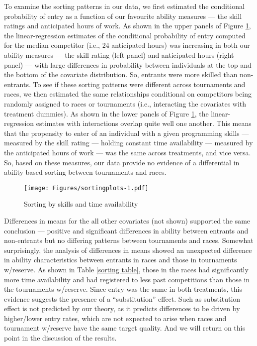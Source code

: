 \documentclass[11pt, titlepage]{article}
\begin{document}
To examine the sorting patterns in our data, we first estimated the
conditional probability of entry as a function of our favourite ability
measures --- the skill ratings and anticipated hours of work. As shown
in the upper panels of Figure \ref{sorting plot}, the linear-regression
estimates of the conditional probability of entry computed for the
median competitor (i.e., 24 anticipated hours) was increasing in both
our ability measures --- the skill rating (left panel) and anticipated
hours (right panel) --- with large differences in probability between
individuals at the top and the bottom of the covariate distribution. So,
entrants were more skilled than non-entrants. To see if these sorting
patterns were different across tournaments and races, we then estimated
the same relationships conditional on competitors being randomly
assigned to races or tournaments (i.e., interacting the covariates with
treatment dummies). As shown in the lower panels of Figure
\ref{sorting plot}, the linear-regression estimates with interactions
overlap quite well one another. This means that the propensity to enter
of an individual with a given programming skills --- measured by the
skill rating --- holding constant time availability --- measured by the
anticipated hours of work --- was the same across treatments, and vice
versa. So, based on these measures, our data provide no evidence of a
differential in ability-based sorting between tournaments and races.

\begin{figure}
\caption{Sorting by skills and time availability}
\label{sorting plot}
\texttt{[image: Figures/sortingplots-1.pdf]}
\end{figure}

Differences in means for the all other covariates (not shown) supported
the same conclusion --- positive and significant differences in ability
between entrants and non-entrants but no differing patterns between
tournaments and races. Somewhat surprisingly, the analysis of
differences in means showed an unexpected difference in ability
characteristics between entrants in races and those in tournaments
w/reserve. As shown in Table \ref{sorting table}, those in the races had
significantly more time availability and had registered to less past
competitions than those in the tournaments w/reserve. Since entry was
the same in both treatments, this evidence suggests the presence of a
``substitution'' effect. Such as substitution effect is not predicted by
our theory, as it predicts differences to be driven by higher/lower
entry rates, which are not expected to arise when races and tournament
w/reserve have the same target quality. And we will return on this point
in the discussion of the results.
\end{document}
